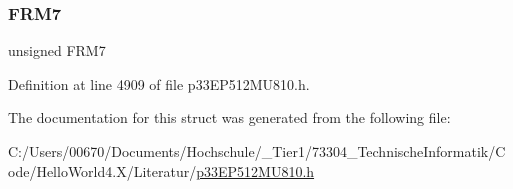 \subsubsection{\texorpdfstring{F\+R\+M7}{FRM7}}
{\footnotesize\ttfamily unsigned F\+R\+M7}



Definition at line 4909 of file p33\+E\+P512\+M\+U810.\+h.



The documentation for this struct was generated from the following file\+:\begin{DoxyCompactItemize}
\item 
C\+:/\+Users/00670/\+Documents/\+Hochschule/\+\_\+\+Tier1/73304\+\_\+\+Technische\+Informatik/\+Code/\+Hello\+World4.\+X/\+Literatur/\hyperlink{p33_e_p512_m_u810_8h}{p33\+E\+P512\+M\+U810.\+h}\end{DoxyCompactItemize}
